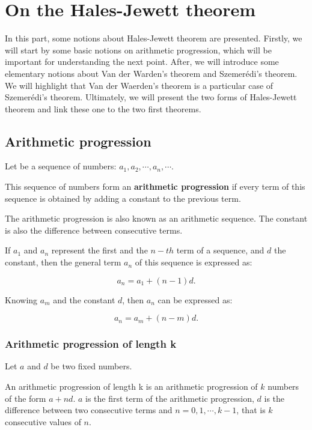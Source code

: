 \chapter{On the Hales-Jewett theorem}

In this part, some notions about Hales-Jewett theorem are presented. Firstly, we will start by some basic notions on arithmetic progression, which will be important for understanding the next point. After, we will introduce some elementary notions about  Van der Warden’s theorem and  Szemerédi's theorem. We will highlight that  Van der Waerden's theorem is a particular case of Szemerédi's theorem. Ultimately, we will present the two forms of Hales-Jewett theorem and link these one to the two first theorems.

\section{Arithmetic progression}

\begin{defn}
Let be a sequence of numbers: $a_1, a_2, \cdots, a_n, \cdots.$ 

This sequence of numbers form an \textbf{arithmetic progression} if every term of this sequence is obtained by adding a constant to the previous term.
\end{defn}
The arithmetic progression is also known as an arithmetic sequence. The constant is also the difference between consecutive terms.

If $a_1$ and $a_n$ represent the first and the $n-th$ term of a sequence, and $d$ the constant, then the general term $a_n$ of this sequence is expressed as:

$$a_n=a_1+(n-1)d.$$

Knowing $a_m$ and the constant $d$, then $a_n$ can be expressed as:
 
$$a_n=a_m+(n-m)d.$$

\subsection{Arithmetic progression of length k}


Let $a$ and $d$ be two fixed numbers.

An arithmetic progression of length k is an arithmetic progression of $k$ numbers of the form $a+nd.$ $a$ is the first term of the arithmetic progression, $d$ is the difference between two consecutive terms and $n=0,1, \cdots, k-1$, that is $k$ consecutive values of $n.$ 

